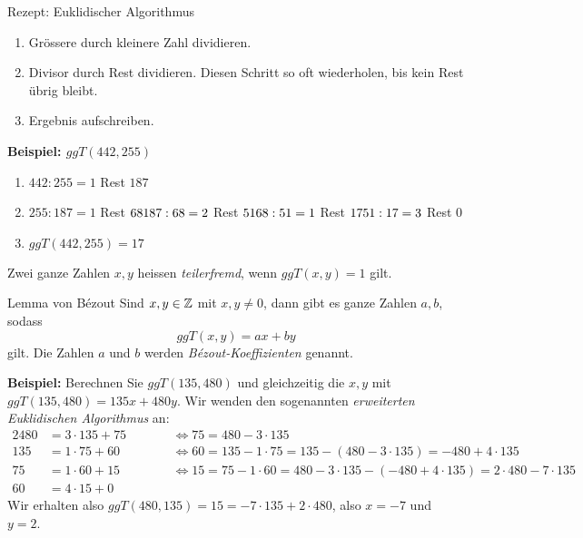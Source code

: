 \begin{mainbox}{Rezept: Euklidischer Algorithmus}
    \begin{enumerate}
        \item Grössere durch kleinere Zahl dividieren.
        \item Divisor durch Rest dividieren.
        Diesen Schritt so oft wiederholen, bis kein Rest übrig bleibt.
        \item Ergebnis aufschreiben.
    \end{enumerate}
\end{mainbox}

\textbf{Beispiel: $ggT(442, 255)$}
\vspace{-\topsep}
\begin{enumerate}
    \item $442 : 255 = 1$ Rest $187$
    \item $255 : 187 = 1$ Rest $68 \\
    187 : 68 = 2$ Rest $51 \\
    68 : 51 = 1$ Rest $17 \\
    51 : 17 = 3$ Rest $0$
    \item $ggT(442, 255) = 17$
\end{enumerate}

\begin{subbox}{}
    Zwei ganze Zahlen $x,y$ heissen \emph{teilerfremd}, wenn $ggT(x,y) = 1$ gilt.
\end{subbox}

\begin{definition}{Lemma von Bézout}
    Sind $x,y \in \mathbb{Z}$ mit $x,y \neq 0$, dann gibt es ganze Zahlen $a,b$, sodass \[ggT(x,y) = ax + by\] gilt.
    Die Zahlen $a$ und $b$ werden \emph{Bézout-Koeffizienten} genannt.
\end{definition}

\textbf{Beispiel:} Berechnen Sie $ggT(135, 480)$ und gleichzeitig die $x,y$ mit $ggT(135, 480) = 135x + 480y$.
Wir wenden den sogenannten \emph{erweiterten Euklidischen Algorithmus} an:
\begin{alignat*}{2}
    480 &= 3 \cdot 135 + 75 \quad \quad &&\Leftrightarrow 75 = 480 - 3 \cdot 135 \\
    135 &= 1 \cdot 75 + 60 &&\Leftrightarrow 60 = 135 - 1 \cdot 75 = 135 - (480 - 3 \cdot 135) = -480 + 4 \cdot 135 \\
    75 &= 1 \cdot 60 + 15 &&\Leftrightarrow 15 = 75 - 1 \cdot 60 = 480 - 3 \cdot 135 - (-480 + 4 \cdot 135) = 2 \cdot 480 - 7 \cdot 135 \\
    60 &= 4 \cdot 15 + 0
\end{alignat*}
Wir erhalten also $ggT(480, 135) = 15 = -7 \cdot 135 + 2 \cdot 480$, also $x = -7$ und $y = 2$.

